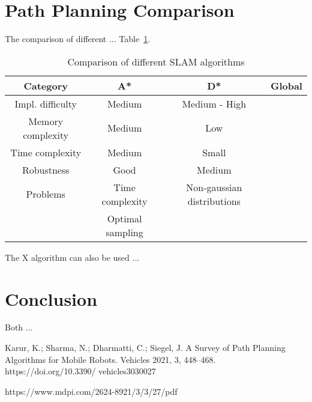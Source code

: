 \documentclass[12pt, a4paper, onecolumn]{article}
\begin{document}
\section{Path Planning Comparison}
The comparison of different ...
Table~\ref{tab:obs_algorithms}.
\begin{table}[h!]
  \begin{center}
    \begin{tabular}[c]{|c || c c c |}
      \hline
       Category        &  A*            & D*            & Global     \\
      \hline
      Impl. difficulty &  Medium        & Medium - High &      \\
      \hline
      Memory complexity&  Medium        & Low           &      \\
      \hline
      Time complexity  &  Medium        & Small         &      \\
      \hline
      Robustness       &  Good          & Medium        &      \\
      \hline
      Problems         & Time complexity & Non-gaussian distributions & \\
                       & Optimal sampling &  & \\
      \hline
    \end{tabular}
  \end{center}
  \caption{Comparison of different SLAM algorithms}
  \label{tab:obs_algorithms}
\end{table}
The X algorithm can also be used ...

\section{Conclusion}

Both ... 
\newpage
\begin{thebibliography}{9}

Karur, K.; Sharma, N.;
Dharmatti, C.; Siegel, J. A Survey of
Path Planning Algorithms for Mobile
Robots. Vehicles 2021, 3, 448–468.
https://doi.org/10.3390/
vehicles3030027


https://www.mdpi.com/2624-8921/3/3/27/pdf

\end{thebibliography}
\end{document}
